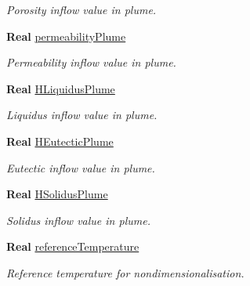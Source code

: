 \begin{DoxyCompactItemize}
\begin{DoxyCompactList}\small\item\em Porosity inflow value in plume. \end{DoxyCompactList}\item 
\mbox{\label{class_mushy_layer_params_a4b59e75468fdf85d06da1539de16ff15}} 
\textbf{ Real} \hyperlink{class_mushy_layer_params_a4b59e75468fdf85d06da1539de16ff15}{permeability\+Plume}
\begin{DoxyCompactList}\small\item\em Permeability inflow value in plume. \end{DoxyCompactList}\item 
\mbox{\label{class_mushy_layer_params_a54b70cb9b79d980e8b0ae541f2123be6}} 
\textbf{ Real} \hyperlink{class_mushy_layer_params_a54b70cb9b79d980e8b0ae541f2123be6}{H\+Liquidus\+Plume}
\begin{DoxyCompactList}\small\item\em Liquidus inflow value in plume. \end{DoxyCompactList}\item 
\mbox{\label{class_mushy_layer_params_ad4c0bfd873c178376e2d9238f97c40f2}} 
\textbf{ Real} \hyperlink{class_mushy_layer_params_ad4c0bfd873c178376e2d9238f97c40f2}{H\+Eutectic\+Plume}
\begin{DoxyCompactList}\small\item\em Eutectic inflow value in plume. \end{DoxyCompactList}\item 
\mbox{\label{class_mushy_layer_params_af82a376576ff4165d3e43729d2f367a9}} 
\textbf{ Real} \hyperlink{class_mushy_layer_params_af82a376576ff4165d3e43729d2f367a9}{H\+Solidus\+Plume}
\begin{DoxyCompactList}\small\item\em Solidus inflow value in plume. \end{DoxyCompactList}\item 
\mbox{\label{class_mushy_layer_params_a3eeb2d5c33ea07b2ae1921af69bde3fc}} 
\textbf{ Real} \hyperlink{class_mushy_layer_params_a3eeb2d5c33ea07b2ae1921af69bde3fc}{reference\+Temperature}
\begin{DoxyCompactList}\small\item\em Reference temperature for nondimensionalisation. \end{DoxyCompactList}\item 

\end{DoxyCompactItemize}
